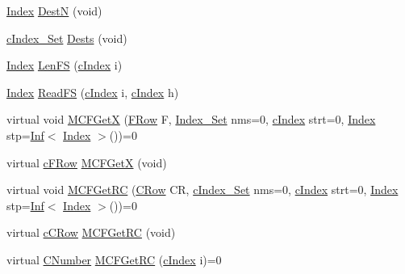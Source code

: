 \begin{DoxyCompactItemize}
\item 
\mbox{\hyperlink{class_m_c_f_class_ad53d6229d7ec28555a9c9c2fd9abf773}{Index}} \mbox{\hyperlink{class_s_p_tree_adfad352a13e6be066a344f09b34148da}{DestN}} (void)
\item 
\mbox{\hyperlink{class_m_c_f_class_a81575b2d4e4d5636b17170432150ae69}{c\+Index\+\_\+\+Set}} \mbox{\hyperlink{class_s_p_tree_a0c4139e9f19c46099f798ec496faca2c}{Dests}} (void)
\item 
\mbox{\hyperlink{class_m_c_f_class_ad53d6229d7ec28555a9c9c2fd9abf773}{Index}} \mbox{\hyperlink{class_s_p_tree_ae131faa3f8901f33f24617a4e61f601b}{Len\+FS}} (\mbox{\hyperlink{class_m_c_f_class_a76aaabb20535c51a2752b93f6c38fe54}{c\+Index}} i)
\item 
\mbox{\hyperlink{class_m_c_f_class_ad53d6229d7ec28555a9c9c2fd9abf773}{Index}} \mbox{\hyperlink{class_s_p_tree_afd79f2ffc8ffb4e444fa60a6bb4ebbe1}{Read\+FS}} (\mbox{\hyperlink{class_m_c_f_class_a76aaabb20535c51a2752b93f6c38fe54}{c\+Index}} i, \mbox{\hyperlink{class_m_c_f_class_a76aaabb20535c51a2752b93f6c38fe54}{c\+Index}} h)
\item 
virtual void \mbox{\hyperlink{class_s_p_tree_a884f1180138ddf3df909347b1c85428c}{M\+C\+F\+GetX}} (\mbox{\hyperlink{class_m_c_f_class_a9dae1f1a39c208ce3c2b337cd5bb3d00}{F\+Row}} F, \mbox{\hyperlink{class_m_c_f_class_ace3388eb329ff0551a0b86b6c67e33d8}{Index\+\_\+\+Set}} nms=0, \mbox{\hyperlink{class_m_c_f_class_a76aaabb20535c51a2752b93f6c38fe54}{c\+Index}} strt=0, \mbox{\hyperlink{class_m_c_f_class_ad53d6229d7ec28555a9c9c2fd9abf773}{Index}} stp=\mbox{\hyperlink{class_o_p_ttypes__di__unipi__it_1_1_inf}{Inf}}$<$ \mbox{\hyperlink{class_m_c_f_class_ad53d6229d7ec28555a9c9c2fd9abf773}{Index}} $>$())=0
\item 
virtual \mbox{\hyperlink{class_m_c_f_class_ad325f3193dbba0ddef1da4e72d29eda6}{c\+F\+Row}} \mbox{\hyperlink{class_s_p_tree_a4eb307e0707adaef99bb0e08c9e10eb8}{M\+C\+F\+GetX}} (void)
\item 
virtual void \mbox{\hyperlink{class_s_p_tree_a361d84ae42041fdbf3824d45fc4c54aa}{M\+C\+F\+Get\+RC}} (\mbox{\hyperlink{class_m_c_f_class_a62409402be4e4b301e1a568f99f877be}{C\+Row}} CR, \mbox{\hyperlink{class_m_c_f_class_a81575b2d4e4d5636b17170432150ae69}{c\+Index\+\_\+\+Set}} nms=0, \mbox{\hyperlink{class_m_c_f_class_a76aaabb20535c51a2752b93f6c38fe54}{c\+Index}} strt=0, \mbox{\hyperlink{class_m_c_f_class_ad53d6229d7ec28555a9c9c2fd9abf773}{Index}} stp=\mbox{\hyperlink{class_o_p_ttypes__di__unipi__it_1_1_inf}{Inf}}$<$ \mbox{\hyperlink{class_m_c_f_class_ad53d6229d7ec28555a9c9c2fd9abf773}{Index}} $>$())=0
\item 
virtual \mbox{\hyperlink{class_m_c_f_class_ab700102e9ba8bb6015be6818d4e99097}{c\+C\+Row}} \mbox{\hyperlink{class_s_p_tree_af027cee8179a876a4879c73820c380d1}{M\+C\+F\+Get\+RC}} (void)
\item 
virtual \mbox{\hyperlink{class_m_c_f_class_a24d0627ba8213afe1ec4ebeb4508e8f1}{C\+Number}} \mbox{\hyperlink{class_s_p_tree_a7c103b582c910ccfda354032aae5722e}{M\+C\+F\+Get\+RC}} (\mbox{\hyperlink{class_m_c_f_class_a76aaabb20535c51a2752b93f6c38fe54}{c\+Index}} i)=0
\end{DoxyCompactItemize}
